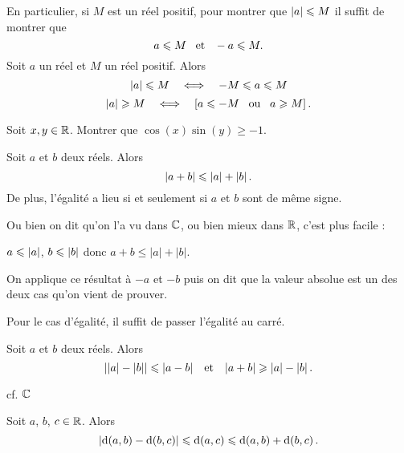 \documentclass{magnoliaold}
\begin{document}
\begin{remarques}
\remarque En particulier, si $M$ est un réel positif, pour montrer que
  $\left|a\right|\leqslant M$ il suffit de montrer que
  \[a\leqslant M \quad\!\text{et}\quad\! -a\leqslant M.\] 
\remarque Soit $a$ un réel et $M$ un réel positif. Alors
  \[\left|a\right|\leqslant M \quad\Longleftrightarrow\quad -M\leqslant a\leqslant M\]
  \[\left|a\right|\geqslant M \quad\Longleftrightarrow\quad \left[a\leqslant -M \quad\!\text{ou}\quad\! a\geqslant M\right].\]
\end{remarques}

\begin{exoUnique}
\exo Soit $x,y\in\mathbb{R}$. Montrer que $\cos(x)\sin(y)\geq -1$.  
\end{exoUnique}

\begin{proposition}
Soit $a$ et $b$ deux réels. Alors
\[\left|a+b\right|\leqslant \left|a\right|+\left|b\right|.\]
De plus, l'égalité a lieu si et seulement si $a$ et $b$ sont de même signe.  
\end{proposition}

\begin{preuve}
Ou bien on dit qu'on l'a vu dans $\mathbb{C}$, ou bien mieux dans $\mathbb{R}$, c'est plus facile :

$a\leqslant \left|a\right|$, $b\leqslant\left|b\right|$ donc $a+b\leq |a|+|b|$.

On applique ce résultat à $-a$ et $-b$ puis on dit que la valeur absolue est un des deux cas qu'on vient de prouver. 

Pour le cas d'égalité, il suffit de passer l'égalité au carré.
\end{preuve}

\begin{proposition}
Soit $a$ et $b$ deux réels. Alors
\[\left|\left|a\right|-\left|b\right|\right|\leqslant\left|a-b\right| \quad\!\text{et}\quad\! \left|a+b\right|\geqslant \left|a\right|-\left|b\right|.\]
\end{proposition}

\begin{preuve}
cf. $\mathbb{C}$
\end{preuve}

\begin{remarqueUnique}
\remarque Soit $a$, $b$, $c\in\mathbb{R}$. Alors
  \[\left|{\rm d}\!\left(a,b\right)-{\rm d}\!\left(b,c\right)\right| \leqslant {\rm d}\!\left(a,c\right) \leqslant
    {\rm d}\!\left(a,b\right)+{\rm d}\!\left(b,c\right).\]
\end{remarqueUnique}
\end{document}
